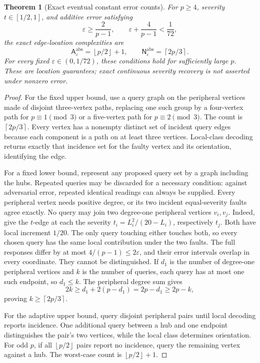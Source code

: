 \documentclass[11pt,letterpaper]{article}
\newtheorem{theorem}{Theorem}
\newcommand{\ceil}[1]{\left\lceil #1\right\rceil}
\newcommand{\floor}[1]{\left\lfloor #1\right\rfloor}
\newcommand{\A}{\mathsf A}
\newcommand{\N}{\mathsf N}
\begin{document}
\begin{theorem}[Exact eventual constant error counts]\label{thm:severitynoise}
For $p\ge4$, severity $t\in[1/2,1]$, and additive error satisfying
\[
 \varepsilon\ge\frac2{p-1},\qquad
 \varepsilon+\frac4{p-1}<\frac1{72},
\]
the exact edge-location complexities are
\[
 \A^{\mathrm{abs}}_\varepsilon=\floor{p/2}+1,\qquad
 \N^{\mathrm{abs}}_\varepsilon=\ceil{2p/3}.
\]
For every fixed $\varepsilon\in(0,1/72)$, these conditions hold for sufficiently large $p$. These are location guarantees; exact continuous severity recovery is not asserted under nonzero error.
\end{theorem}
\begin{proof}
For the fixed upper bound, use a query graph on the peripheral vertices made of disjoint three-vertex paths, replacing one such group by a four-vertex path for $p\equiv1\pmod3$ or a five-vertex path for $p\equiv2\pmod3$. The count is $\ceil{2p/3}$. Every vertex has a nonempty distinct set of incident query edges because each component is a path on at least three vertices. Local-class decoding returns exactly that incidence set for the faulty vertex and its orientation, identifying the edge.

For a fixed lower bound, represent any proposed query set by a graph including the hubs. Repeated queries may be discarded for a necessary condition: against adversarial error, repeated identical readings can always be supplied. Every peripheral vertex needs positive degree, or its two incident equal-severity faults agree exactly. No query may join two degree-one peripheral vertices $v_i,v_j$. Indeed, give the $t$-edge at each the severity $t_i=L_i^2/(20-L_i)$, respectively $t_j$. Both have local increment $1/20$. The only query touching either touches both, so every chosen query has the same local contribution under the two faults. The full responses differ by at most $4/(p-1)\le2\varepsilon$, and their error intervals overlap in every coordinate. They cannot be distinguished. If $d_1$ is the number of degree-one peripheral vertices and $k$ is the number of queries, each query has at most one such endpoint, so $d_1\le k$. The peripheral degree sum gives
\[
 2k\ge d_1+2(p-d_1)=2p-d_1\ge2p-k,
\]
proving $k\ge\ceil{2p/3}$.

For the adaptive upper bound, query disjoint peripheral pairs until local decoding reports incidence. One additional query between a hub and one endpoint distinguishes the pair's two vertices, while the local class determines orientation. For odd $p$, if all $\floor{p/2}$ pairs report no incidence, query the remaining vertex against a hub. The worst-case count is $\floor{p/2}+1$.


\end{proof}
\end{document}
